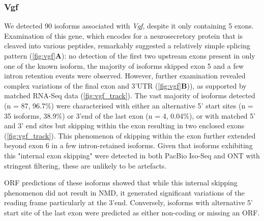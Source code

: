 \subsubsection{Vgf}
We detected 90 isoforms associated with \textit{Vgf}, despite it only containing 5 exons. Examination of this gene, which encodes for a neurosecretory protein that is cleaved into various peptides, remarkably suggested a relatively simple splicing pattern (\cref{fig:vgf}\textbf{A}): no detection of the first two upstream exons present in only one of the known isoform, the majority of isoforms skipped exon 5 and a few intron retention events were observed. However, further examination revealed complex variations of the final exon and 3'UTR (\cref{fig:vgf}\textbf{B})), as supported by matched RNA-Seq data (\cref{fig:vgf_track}). The vast majority of isoforms detected (n = 87, 96.7\%) were characterised with either an alternative 5' start sites (n = 35 isoforms, 38.9\%) or 3'end of the last exon (n = 4, 0.04\%), or with matched 5' and 3' end sites but skipping within the exon resulting in two enclosed exons (\cref{fig:vgf_track}). This phenomenon of skipping within the exon further extended beyond exon 6 in a few intron-retained isoforms. Given that isoforms exhibiting this "internal exon skipping" were detected in both PacBio Iso-Seq and ONT with stringent filtering, these are unlikely to be artefacts. 

ORF predictions of these isoforms showed that while this internal skipping phenomenon did not result in NMD, it generated significant variations of the reading frame particularly at the 3'end. Conversely, isoforms with alternative 5' start site of the last exon were predicted as either non-coding or missing an ORF.

